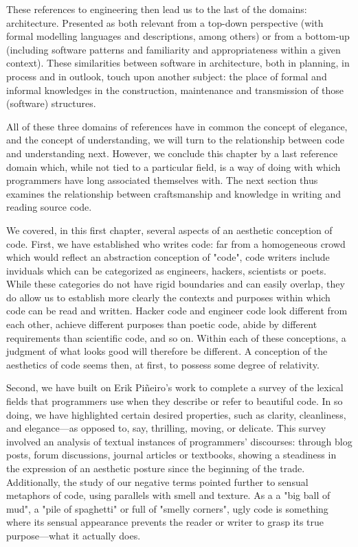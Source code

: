 These references to engineering then lead us to the last of the domains: architecture. Presented as both relevant from a top-down perspective (with formal modelling languages and descriptions, among others) or from a bottom-up (including software patterns and familiarity and appropriateness within a given context). These similarities between software in architecture, both in planning, in process and in outlook, touch upon another subject: the place of formal and informal knowledges in the construction, maintenance and transmission of those (software) structures.

All of these three domains of references have in common the concept of elegance, and the concept of understanding, we will turn to the relationship between code and understanding next. However, we conclude this chapter by a last reference domain which, while not tied to a particular field, is a way of doing with which programmers have long associated themselves with. The next section thus examines the relationship between craftsmanship and knowledge in writing and reading source code.

\pagebreak

We covered, in this first chapter, several aspects of an aesthetic conception of code. First, we have established who writes code: far from a homogeneous crowd which would reflect an abstraction conception of "code", code writers include inviduals which can be categorized as engineers, hackers, scientists or poets. While these categories do not have rigid boundaries and can easily overlap, they do allow us to establish more clearly the contexts and purposes within which code can be read and written. Hacker code and engineer code look different from each other, achieve different purposes than poetic code, abide by different requirements than scientific code, and so on. Within each of these conceptions, a judgment of what looks good will therefore be different. A conception of the aesthetics of code seems then, at first, to possess some degree of relativity.

Second, we have built on Erik Piñeiro's work to complete a survey of the lexical fields that programmers use when they describe or refer to beautiful code. In so doing, we have highlighted certain desired properties, such as clarity, cleanliness, and elegance—as opposed to, say, thrilling, moving, or delicate. This survey involved an analysis of textual instances of programmers' discourses: through blog posts, forum discussions, journal articles or textbooks, showing a steadiness in the expression of an aesthetic posture since the beginning of the trade. Additionally, the study of our negative terms pointed further to sensual metaphors of code, using parallels with smell and texture. As a a "big ball of mud", a "pile of spaghetti" or full of "smelly corners", ugly code is something where its sensual appearance prevents the reader or writer to grasp its true purpose—what it actually does.

